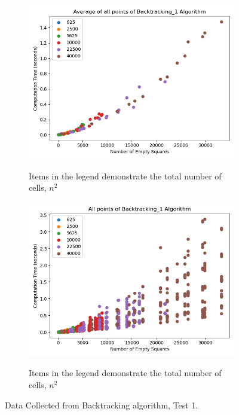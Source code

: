 \documentclass{article}
\begin{document}
\begin{figure}[!h]
	\centering
	\begin{subfigure}{0.4\textwidth}
		\centering
		\includegraphics[scale=0.4]{scatter_avg_Backtracking_1-1.png}
		\label{Test 1: Average of all points}
		\caption{Items in the legend demonstrate the total number of cells, $n^2$}
	\end{subfigure}
	\hfill
	\begin{subfigure}{0.4\textwidth}
		\centering
		\includegraphics[scale=0.4]{scatter_Backtracking_1-1.png}
		\label{Test 1: Scatter plot of all collected points}
		\caption{Items in the legend demonstrate the total number of cells, $n^2$}
	\end{subfigure}
	\caption{Data Collected from Backtracking algorithm, Test 1.}
\end{figure}
\end{document}
